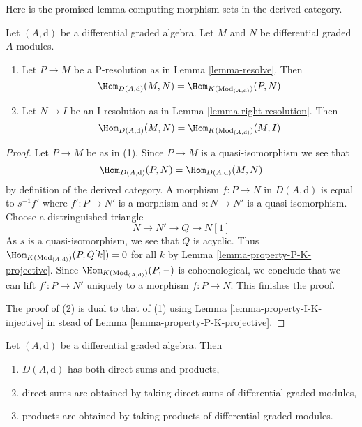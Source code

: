 \noindent
Here is the promised lemma computing morphism sets in the
derived category.

\begin{lemma}
\label{lemma-hom-derived}
Let $(A, \text{d})$ be a differential graded algebra.
Let $M$ and $N$ be differential graded $A$-modules.
\begin{enumerate}
\item Let $P \to M$ be a P-resolution as in
Lemma \ref{lemma-resolve}. Then
$$
\Hom_{D(A, \text{d})}(M, N) =
\Hom_{K(\text{Mod}_{(A, \text{d})})}(P, N)
$$
\item Let $N \to I$ be an I-resolution as in
Lemma \ref{lemma-right-resolution}. Then
$$
\Hom_{D(A, \text{d})}(M, N) =
\Hom_{K(\text{Mod}_{(A, \text{d})})}(M, I)
$$
\end{enumerate}
\end{lemma}

\begin{proof}
Let $P \to M$ be as in (1). Since $P \to M$ is a quasi-isomorphism we see that
$$
\Hom_{D(A, \text{d})}(P, N) = \Hom_{D(A, \text{d})}(M, N)
$$
by definition of the derived category. A morphism
$f : P \to N$ in $D(A, \text{d})$ is equal to
$s^{-1}f'$ where $f' : P \to N'$ is a morphism and
$s : N \to N'$ is a quasi-isomorphism. Choose a distringuished triangle
$$
N \to N' \to Q \to N[1]
$$
As $s$ is a quasi-isomorphism, we see that $Q$ is acyclic. Thus
$\Hom_{K(\text{Mod}_{(A, \text{d})})}(P, Q[k]) = 0$ for all $k$ by
Lemma \ref{lemma-property-P-K-projective}. Since
$\Hom_{K(\text{Mod}_{(A, \text{d})})}(P, -)$
is cohomological, we conclude that we can lift $f' : P \to N'$
uniquely to a morphism $f : P \to N$. This finishes the proof.

\medskip\noindent
The proof of (2) is dual to that of (1) using
Lemma \ref{lemma-property-I-K-injective} in stead of
Lemma \ref{lemma-property-P-K-projective}.
\end{proof}

\begin{lemma}
\label{lemma-derived-products}
Let $(A, \text{d})$ be a differential graded algebra. Then
\begin{enumerate}
\item $D(A, \text{d})$ has both direct sums and products,
\item direct sums are obtained by taking direct sums of differential graded
modules,
\item products are obtained by taking products of differential
graded modules.
\end{enumerate}
\end{lemma}


